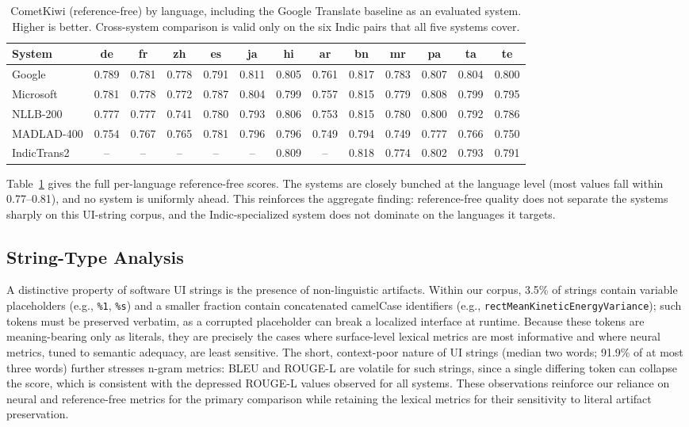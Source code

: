 \documentclass[Afour,sagev,times,doublespace]{sagej}
\begin{document}
\begin{table}[t]
\small\sf\centering
\caption{CometKiwi (reference-free) by language, including the Google Translate baseline as an evaluated system. Higher is better. Cross-system comparison is valid only on the six Indic pairs that all five systems cover.\label{tab:cometkiwi_lang}}
\begin{tabular}{@{}lcccccccccccc@{}}
\toprule
System & de & fr & zh & es & ja & hi & ar & bn & mr & pa & ta & te \\
\midrule
Google & 0.789 & 0.781 & 0.778 & 0.791 & 0.811 & 0.805 & 0.761 & 0.817 & 0.783 & 0.807 & 0.804 & 0.800 \\
Microsoft & 0.781 & 0.778 & 0.772 & 0.787 & 0.804 & 0.799 & 0.757 & 0.815 & 0.779 & 0.808 & 0.799 & 0.795 \\
NLLB-200 & 0.777 & 0.777 & 0.741 & 0.780 & 0.793 & 0.806 & 0.753 & 0.815 & 0.780 & 0.800 & 0.792 & 0.786 \\
MADLAD-400 & 0.754 & 0.767 & 0.765 & 0.781 & 0.796 & 0.796 & 0.749 & 0.794 & 0.749 & 0.777 & 0.766 & 0.750 \\
IndicTrans2 & -- & -- & -- & -- & -- & 0.809 & -- & 0.818 & 0.774 & 0.802 & 0.793 & 0.791 \\
\bottomrule
\end{tabular}
\end{table}

Table~\ref{tab:cometkiwi_lang} gives the full per-language reference-free scores. The systems are closely bunched at the language level (most values fall within 0.77--0.81), and no system is uniformly ahead. This reinforces the aggregate finding: reference-free quality does not separate the systems sharply on this UI-string corpus, and the Indic-specialized system does not dominate on the languages it targets.

\subsection{String-Type Analysis}

A distinctive property of software UI strings is the presence of non-linguistic artifacts. Within our corpus, 3.5\% of strings contain variable placeholders (e.g., \texttt{\%1}, \texttt{\%s}) and a smaller fraction contain concatenated camelCase identifiers (e.g., \texttt{rectMeanKineticEnergyVariance}); such tokens must be preserved verbatim, as a corrupted placeholder can break a localized interface at runtime. Because these tokens are meaning-bearing only as literals, they are precisely the cases where surface-level lexical metrics are most informative and where neural metrics, tuned to semantic adequacy, are least sensitive. The short, context-poor nature of UI strings (median two words; 91.9\% of at most three words) further stresses n-gram metrics: BLEU and ROUGE-L are volatile for such strings, since a single differing token can collapse the score, which is consistent with the depressed ROUGE-L values observed for all systems. These observations reinforce our reliance on neural and reference-free metrics for the primary comparison while retaining the lexical metrics for their sensitivity to literal artifact preservation.
\end{document}
